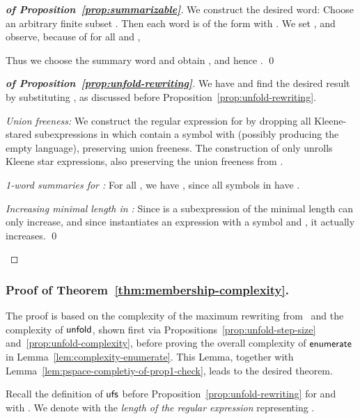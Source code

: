 \documentclass[envcountsame]{llncs}
\newcommand{\setenumeration}{\ensuremath{{\sf enumerate}}\xspace}
\newcommand{\unfold}{\ensuremath{{\sf unfold}}\xspace}
\newcommand{\unfoldstep}{\ensuremath{{\sf ufs}}\xspace}
\begin{document}
\begin{proof}[\textbf{of Proposition~\ref{prop:summarizable}}]
  We construct  the desired word:
Choose an arbitrary finite subset . 
Then each word  is of the form
   with
  .
We set , and
  observe, because of  for all 
  and ,
  
Thus we choose the summary word  and obtain
  , and hence
   .
\qed
\end{proof}



\begin{proof}[\textbf{of Proposition~\ref{prop:unfold-rewriting}}]
  We have 
and find the desired result by substituting , as discussed before
  Proposition~\ref{prop:unfold-rewriting}.

  \begin{inparaenum}[\bfseries(1)]
  \item \emph{Union freeness:} We construct the regular expression for
     by dropping all Kleene-stared subexpressions in
     which contain a symbol  with
     (possibly producing the empty
    language), preserving union freeness.
The construction of  only unrolls Kleene star expressions,
    also preserving the union freeness  from . 
  \item \emph{1-word summaries for :} For all , we
    have , since all symbols  in 
    have .
  \item \emph{Increasing minimal length in :} Since  is a subexpression of
     the minimal length can only increase,
    and since  instantiates an expression with a symbol
     and , it actually
    increases. \qed
  \end{inparaenum}
\end{proof}



\subsubsection{Proof of Theorem~\ref{thm:membership-complexity}.}
The proof is based on the complexity of the maximum rewriting
from~\cite{rewriting} and the complexity of \unfold, shown first via
Propositions~\ref{prop:unfold-step-size}
and~\ref{prop:unfold-complexity}, before proving the overall
complexity of \setenumeration in Lemma~\ref{lem:complexity-enumerate}.
This Lemma, together with
Lemma~\ref{lem:pspace-completiy-of-prop1-check}, leads to the desired
theorem. 


Recall the definition of \unfoldstep before
Proposition~\ref{prop:unfold-rewriting} for
 and 
with .
We denote with  the \emph{length of the regular expression}
representing .
\end{document}
